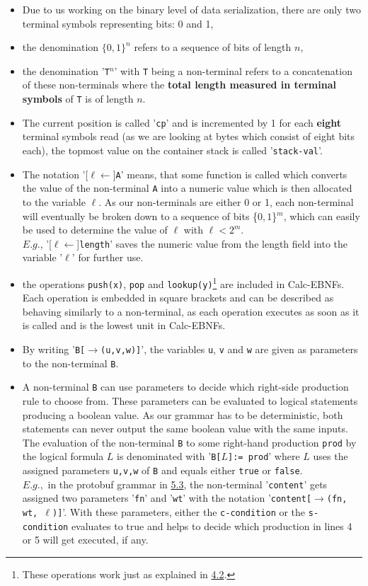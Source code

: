 \begin{itemize}
    \item Due to us working on the binary level of data serialization, there are only two terminal symbols representing bits: 0 and 1,
    \item the denomination $\{0,1\}^n$ refers to a sequence of bits of length $n$,
    \item the denomination '\texttt{T}$^n$' with \texttt{T} being a non-terminal refers to a concatenation of these non-terminals where the \textbf{total length measured in terminal symbols} of \texttt{T} is of length $n$.
    \item The current position is called '\texttt{cp}' and is incremented by 1 for each \textbf{eight} terminal symbols read (as we are looking at bytes which consist of eight bits each), the topmost value on the container stack is called '\texttt{stack-val}'.
    \item The notation '[$\ell\leftarrow$]\texttt{A}' means, that some function is called which converts the value of the non-terminal \texttt{A} into a numeric value which is then allocated to the variable $\ell$. As our non-terminals are either 0 or 1, each non-terminal will eventually be broken down to a sequence of bits \{$0,1$\}$^m$, which can easily be used to determine the value of $\ell$ with $\ell < 2^m$.\\$E.g.$, '[$\ell\leftarrow$]\texttt{length}' saves the numeric value from the length field into the variable '$\ell$' for further use.
    \item the operations \texttt{push(x)}, \texttt{pop} and \texttt{lookup(y)}\footnote{These operations work just as explained in \hyperref[4.2]{4.2}.} are included in Calc-EBNFs.
    Each operation is embedded in square brackets and can be described as behaving similarly to a non-terminal, as each operation executes as soon as it is called and is the lowest unit in Calc-EBNFs.
    \item By writing '\texttt{B[$\rightarrow$(u,v,w)]}', the variables \texttt{u}, \texttt{v} and \texttt{w} are given as parameters to the non-terminal \texttt{B}.
    \item A non-terminal \texttt{B} can use parameters to decide which right-side production rule to choose from. These parameters can be evaluated to logical statements producing a boolean value. As our grammar has to be deterministic, both statements can never output the same boolean value with the same inputs. The evaluation of the non-terminal \texttt{B} to some right-hand production \texttt{prod} by the logical formula $L$ is denominated with '\texttt{B[$L$]:= prod}' where $L$ uses the assigned parameters \texttt{u,v,w} of \texttt{B} and equals either \texttt{true} or \texttt{false}.\\ $E.g.,$ in the protobuf grammar in \hyperref[5.3]{5.3}, the non-terminal '\texttt{content}' gets assigned two parameters '\texttt{fn}' and '\texttt{wt}' with the notation '\texttt{content[$\rightarrow$(fn, wt, $\ell$)]}'. With these parameters, either the \texttt{c-condition} or the \texttt{s-condition} evaluates to true and helps to decide which production in lines 4 or 5 will get executed, if any.
\end{itemize}

